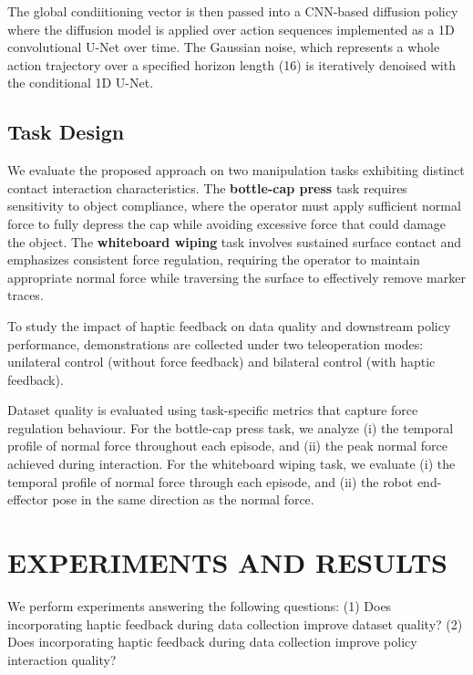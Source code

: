 \documentclass[letterpaper, 10 pt, conference]{ieeeconf}  %
\begin{document}
The global condiitioning vector is then passed into a CNN-based diffusion policy where the diffusion model is applied over action sequences implemented as a 1D convolutional U-Net over time. The Gaussian noise, which represents a whole action trajectory over a specified horizon length (16) is iteratively denoised with the conditional 1D U-Net. %


\subsection{Task Design}
We evaluate the proposed approach on two manipulation tasks exhibiting distinct contact interaction characteristics. The \textbf{bottle-cap press} task requires sensitivity to object compliance, where the operator must apply sufficient normal force to fully depress the cap while avoiding excessive force that could damage the object. The \textbf{whiteboard wiping}  task involves sustained surface contact and emphasizes consistent force regulation, requiring the operator to maintain appropriate normal force while traversing the surface to effectively remove marker traces.

To study the impact of haptic feedback on data quality and downstream policy performance, demonstrations are collected under two teleoperation modes: unilateral control (without force feedback) and bilateral control (with haptic feedback).

Dataset quality is evaluated using task-specific metrics that capture force regulation behaviour. For the bottle-cap press task, we analyze (i) the temporal profile of normal force throughout each episode, and (ii) the peak normal force achieved during interaction. For the whiteboard wiping task, we evaluate (i) the temporal profile of normal force through each episode, and (ii) the robot end-effector pose in the same direction as the normal force. 

 


\section{EXPERIMENTS AND RESULTS}
We perform experiments answering the following questions:
(1) Does incorporating haptic feedback during data collection improve dataset quality?
(2) Does incorporating haptic feedback during data collection improve policy interaction quality?
\end{document}
